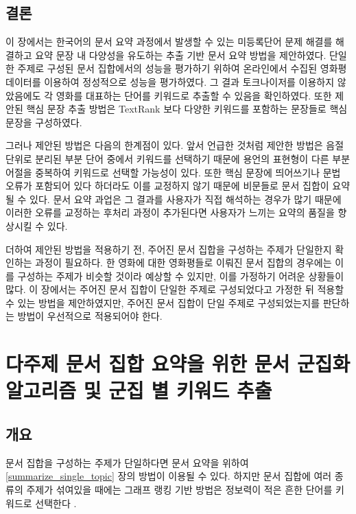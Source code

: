 \documentclass[oneside, ko,phd]{snuthesis_utf8_kor}
\begin{document}
\section{결론}

이 장에서는 한국어의 문서 요약 과정에서 발생할 수 있는 미등록단어 문제 해결를 해결하고 요약 문장 내 다양성을 유도하는 추출 기반 문서 요약 방법을 제안하였다.
단일한 주제로 구성된 문서 집합에서의 성능을 평가하기 위하여 온라인에서 수집된 영화평 데이터를 이용하여 정성적으로 성능을 평가하였다.
그 결과 토크나이저를 이용하지 않았음에도 각 영화를 대표하는 단어를 키워드로 추출할 수 있음을 확인하였다.
또한 제안된 핵심 문장 추출 방법은 TextRank 보다 다양한 키워드를 포함하는 문장들로 핵심 문장을 구성하였다.

그러나 제안된 방법은 다음의 한계점이 있다.
앞서 언급한 것처럼 제안한 방법은 음절 단위로 분리된 부분 단어 중에서 키워드를 선택하기 때문에 용언의 표현형이 다른 부분어절을 중복하여 키워드로 선택할 가능성이 있다.
또한 핵심 문장에 띄어쓰기나 문법 오류가 포함되어 있다 하더라도 이를 교정하지 않기 때문에 비문들로 문서 집합이 요약될 수 있다.
문서 요약 과업은 그 결과를 사용자가 직접 해석하는 경우가 많기 때문에 이러한 오류를 교정하는 후처리 과정이 추가된다면 사용자가 느끼는 요약의 품질을 향상시킬 수 있다.

더하여 제안된 방법을 적용하기 전, 주어진 문서 집합을 구성하는 주제가 단일한지 확인하는 과정이 필요하다.
한 영화에 대한 영화평들로 이뤄진 문서 집합의 경우에는 이를 구성하는 주제가 비슷할 것이라 예상할 수 있지만, 이를 가정하기 어려운 상황들이 많다.
이 장에서는 주어진 문서 집합이 단일한 주제로 구성되었다고 가정한 뒤 적용할 수 있는 방법을 제안하였지만, 주어진 문서 집합이 단일 주제로 구성되었는지를 판단하는 방법이 우선적으로 적용되어야 한다.

\newpage
\chapter{다주제 문서 집합 요약을 위한 문서 군집화 알고리즘 및 군집 별 키워드 추출} \label{improved_kmeans}

\section{개요}

문서 집합을 구성하는 주제가 단일하다면 문서 요약을 위하여 \ref{summarize_single_topic} 장의 방법이 이용될 수 있다.
하지만 문서 집합에 여러 종류의 주제가 섞여있을 때에는 그래프 랭킹 기반 방법은 정보력이 적은 흔한 단어를 키워드로 선택한다 \cite{goldstein2000multi, lin2002single, filippova2008sentence, filippova2010multi}.
\end{document}
